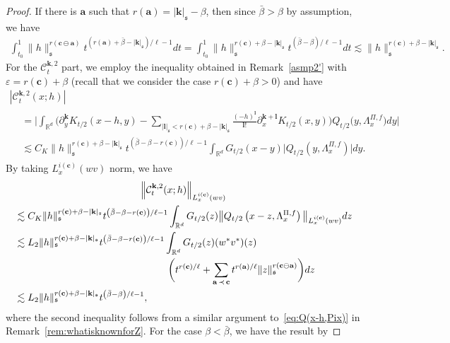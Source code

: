\documentclass[10pt]{amsart}
\theoremstyle{definition}
\numberwithin{equation}{section}
\newcommand{\bbR}{\mathbb{R}}
\newcommand{\mfs}{\mathfrak{s}}
\newcommand{\wco}{w^*}
\newcommand{\vco}{v^*}
\newcommand{\bfa}{\mathbf{a}}
\newcommand{\bfc}{\mathbf{c}}
\newcommand{\bfcoa}{\mathbf{c}\ominus\mathbf{a}}
\newcommand{\bfk}{\mathbf{k}}
\newcommand{\bfl}{\mathbf{l}}
\newcommand{\mcC}{\mathcal{C}}
\begin{document}
\begin{proof}
If there is $\bfa$ such that $r(\bfa)=|{\bfk}|_\mfs-\beta$, then since $\bar\beta>\beta$ by assumption, we have
\begin{align*}
\int_{t_0}^1\|h\|_{\mfs}^{r(\bfcoa)}t^{\left(r(\bfa)+\bar\beta-|{\bfk}|_{\mfs}\right)/\ell-1}dt =\int_{t_0}^1\|h\|_{\mfs}^{r(\bfc)+\beta-|{\bfk}|_\mfs}t^{(\bar\beta-\beta)/\ell-1}dt
\lesssim\|h\|_\mfs^{r(\bfc)+\beta-|{\bfk}|_\mfs}.
\end{align*}
For the $\mcC_t^{{\bfk},2}$ part, we employ the inequality obtained in Remark~\ref{asmp2'} with $\varepsilon=r(\bfc)+\beta$ (recall that we consider the case $r(\bfc)+\beta>0$) and have
\begin{multline}\label{ex:Ck2}
\left|\mcC_t^{{\bfk},2}(x;h)\right|\\
\begin{aligned}
&=\bigg|\int_{\bbR^d}\bigg(\partial_y^{\bfk}K_{t/2}(x-h,y)-\sum_{|{\bfl}|_\mfs<r(\bfc)+\beta-|{\bfk}|_\mfs}\frac{(-h)^{\bfl}}{{\bfl}!}\partial_x^{{\bfk}+{\bfl}}K_{t/2}(x,y)\bigg) Q_{t/2}\big(y,\Lambda_x^{\Pi,f}\big)dy\bigg|\\
&\lesssim C_K\|h\|_\mfs^{r(\bfc)+\beta-|{\bfk}|_\mfs}t^{\left(\bar\beta-\beta-r(\bfc)\right)/\ell-1}\int_{\bbR^d}G_{t/2}(x-y)\big|Q_{t/2}\left(y,\Lambda_x^{\Pi,f}\right)\big|dy.
\end{aligned}
\end{multline}
By taking $L_x^{i(\bfc)}(wv)$ norm, we have
\begin{multline*}
\left\|\mcC_t^{{\bfk},2}(x;h)\right\|_{L_x^{i(\bfc)}(wv)}\\
\begin{aligned}
&\lesssim C_K\|h\|_\mfs^{r(\bfc)+\beta-|{\bfk}|_\mfs}t^{\left(\bar\beta-\beta-r(\bfc)\right)/\ell-1}
\int_{\bbR^d}G_{t/2}(z)\big\|Q_{t/2}\left(x-z,\Lambda_x^{\Pi,f}\right)\big\|_{L_x^{i(\bfc)}(wv)}dz
\\
&\lesssim L_2\|h\|_\mfs^{r(\bfc)+\beta-|{\bfk}|_\mfs}t^{\left(\bar\beta-\beta-r(\bfc)\right)/\ell-1}\int_{\bbR^d}G_{t/2}(z)(\wco\vco)(z)\\
&\mkern280mu\bigg(t^{r(\bfc)/\ell}+\sum_{\bfa\,\prec \,\bfc}t^{r(\bfa)/\ell}\|z\|_{\mfs}^{r(\bfcoa)}\bigg)dz\\
&\lesssim L_2\|h\|_\mfs^{r(\bfc)+\beta-|{\bfk}|_\mfs}t^{\left(\bar\beta-\beta\right)/\ell-1},
\end{aligned}
\end{multline*}
where the second inequality follows from a similar argument to~\eqref{eq:Q(x-h,Pix)} in Remark~\ref{rem:whatisknownforZ}. For the case $\beta<\bar\beta$, we have the result by

\end{proof}
\end{document}
